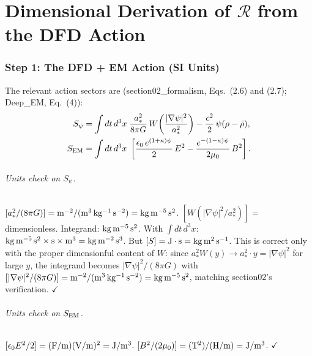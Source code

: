 \documentclass[11pt]{article}
\theoremstyle{definition}
\theoremstyle{remark}
\begin{document}
\part{Dimensional Derivation of $\mathcal{R}$ from the DFD Action}
\label{part:derivation}


\section{Step 1: The DFD + EM Action (SI Units)}
\label{sec:dim-step1}

The relevant action sectors are (section02\_formalism, Eqs.~(2.6)
and (2.7); Deep\_EM, Eq.~(4)):
\begin{align}
S_\psi &= \int dt\,d^3x\;\frac{a_*^2}{8\pi G}\,
  W\!\left(\frac{|\nabla\psi|^2}{a_*^2}\right)
  - \frac{c^2}{2}\,\psi(\rho - \bar\rho),
\label{eq:S-psi}\\
S_{\rm EM} &= \int dt\,d^3x\;\left[
  \frac{\epsilon_0\,e^{(1+\kappa)\psi}}{2}\,E^2
  - \frac{e^{-(1-\kappa)\psi}}{2\mu_0}\,B^2
\right].
\label{eq:S-EM}
\end{align}

\paragraph{Units check on $S_\psi$.}
$[a_*^2/(8\pi G)] = {\rm m}^{-2}/({\rm m^3\,kg^{-1}\,s^{-2}})
= {\rm kg\,m^{-5}\,s^2}$.
$[W(|\nabla\psi|^2/a_*^2)]$ = dimensionless.
Integrand: ${\rm kg\,m^{-5}\,s^2}$. With $\int dt\,d^3x$:
${\rm kg\,m^{-5}\,s^2 \times s \times m^3} = {\rm kg\,m^{-2}\,s^3}$.
But $[S] = {\rm J\cdot s} = {\rm kg\,m^2\,s^{-1}}$. This is
correct only with the proper dimensionful content of $W$: since
$a_*^2 W(y) \to a_*^2 \cdot y = |\nabla\psi|^2$ for large $y$,
the integrand becomes $|\nabla\psi|^2/(8\pi G)$ with
$[|\nabla\psi|^2/(8\pi G)] = {\rm m^{-2}}/({\rm m^3\,kg^{-1}\,s^{-2}})
= {\rm kg\,m^{-5}\,s^2}$, matching section02's verification. $\checkmark$

\paragraph{Units check on $S_{\rm EM}$.}
$[\epsilon_0 E^2/2] = ({\rm F/m})({\rm V/m})^2 = {\rm J/m^3}$.
$[B^2/(2\mu_0)] = ({\rm T}^2)/({\rm H/m}) = {\rm J/m^3}$. $\checkmark$
\end{document}
